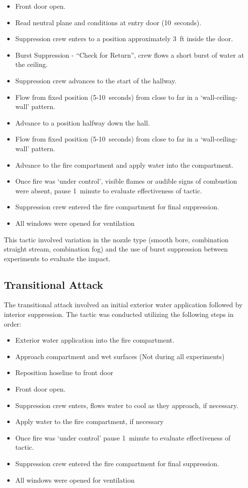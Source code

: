 \documentclass[12pt,oneside]{book}
\begin{document}
\begin{itemize}
	\item{Front door open.}
	\item{Read neutral plane and conditions at entry door (10~seconds).}
	\item{Suppression crew enters to a position approximately 3~ft inside the door.}
	\item{Burst Suppression - ``Check for Return'', crew flows a short burst of water at the ceiling.}
	\item{Suppression crew advances to the start of the hallway.}
	\item{Flow from fixed position (5-10~seconds) from close to far in a `wall-ceiling-wall' pattern.}
	\item{Advance to a position halfway down the hall.}
	\item{Flow from fixed position (5-10~seconds) from close to far in a `wall-ceiling-wall' pattern.}
	\item{Advance to the fire compartment and apply water into the compartment.}
	\item{Once fire was `under control', visible flames or audible signs of combustion were absent, pause 1~minute to evaluate effectiveness of tactic.}
	\item{Suppression crew entered the fire compartment for final suppression.}
	\item{All windows were opened for ventilation}
\end{itemize}

This tactic involved variation in the nozzle type (smooth bore, combination straight stream, combination fog) and the use of burst suppression between experiments to evaluate the impact. 

\clearpage

\subsection{Transitional Attack}
The transitional attack involved an initial exterior water application followed by interior suppression. The tactic was conducted utilizing the following steps in order:

\begin{itemize}
	\item{Exterior water application into the fire compartment.}
	\item{Approach compartment and wet surfaces (Not during all experiments)}
	\item{Reposition hoseline to front door}
	\item{Front door open.}
	\item{Suppression crew enters, flows water to cool as they approach, if necessary.}
	\item{Apply water to the fire compartment, if necessary}
	\item{Once fire was `under control' pause 1~minute to evaluate effectiveness of tactic.}
	\item{Suppression crew entered the fire compartment for final suppression.}
	\item{All windows were opened for ventilation}
\end{itemize}
\end{document}
